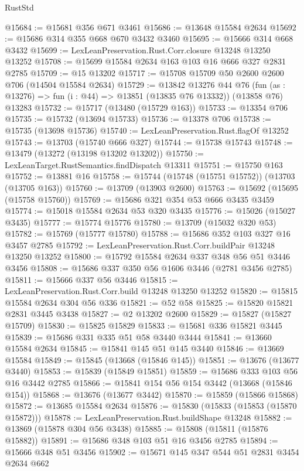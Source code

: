 \begin{lexlean}{RustStd}
\begin{coremodule}
@15684 := @15681 @356 @671 @3461
@15686 := @13648 @15584 @2634
@15692 := @15686 @314 @355 @668 @670 @3432 @3460
@15695 := @15666 @314 @668 @3432
@15699 := LexLeanPreservation.Rust.Corr.closure @13248 @13250 @13252
@15708 := @15699 @15584 @2634 @163 @103 @16 @666 @327 @2831 @2785
@15709 := @15 @13202
@15717 := @15708 @15709 @50 @2600 @2600 @706 (@14504 @15584 @2634)
@15729 := @13842
    @13276
    @44
    @76
    (fun (as : @13276) => fun (i : @44) => @13851 (@13835 @76 @13332))
    (@13858 @76)
    @13283
@15732 := @15717 (@13480 (@15729 @163))
@15733 := @13354 @706
@15735 := @15732 (@13694 @15733)
@15736 := @13378 @706
@15738 := @15735 (@13698 @15736)
@15740 := LexLeanPreservation.Rust.flagOf @13252
@15743 := @13703 (@15740 @666 @327)
@15744 := @15738 @15743
@15748 := @13479 (@13272 (@13198 @13202 @13202))
@15750 := LexLeanTarget.RustSemantics.findDispatch @13311
@15751 := @15750 @163
@15752 := @13881 @16
@15758 := @15744 (@15748 (@15751 @15752)) (@13703 (@13705 @163))
@15760 := @13709 (@13903 @2600)
@15763 := @15692 (@15695 (@15758 @15760))
@15769 := @15686 @321 @354 @53 @666 @3435 @3459
@15774 := @15018 @15584 @2634 @53 @320 @3435
@15776 := @15026 (@15027 @3435)
@15777 := @15774 @15776
@15780 := @13709 (@15032 @320 @53)
@15782 := @15769 (@15777 @15780)
@15788 := @15686 @352 @103 @327 @16 @3457 @2785
@15792 := LexLeanPreservation.Rust.Corr.buildPair @13248 @13250 @13252
@15800 := @15792 @15584 @2634 @337 @348 @56 @51 @3446 @3456
@15808 := @15686 @337 @350 @56 @1606 @3446 (@2781 @3456 @2785)
@15811 := @15666 @337 @56 @3446
@15815 := LexLeanPreservation.Rust.Corr.build @13248 @13250 @13252
@15820 := @15815 @15584 @2634 @304 @56 @336
@15821 := @52 @58
@15825 := @15820 @15821 @2831 @3445 @3438
@15827 := @2 @13202 @2600
@15829 := @15827 (@15827 @15709)
@15830 := @15825 @15829
@15833 := @15681 @336 @15821 @3445
@15839 := @15686 @331 @335 @51 @58 @3440 @3444
@15841 := @13660 @15584 @2634
@15845 := @15841 @145 @51 @145 @3440
@15846 := @13669 @15584
@15849 := @15845 (@13668 (@15846 @145))
@15851 := @13676 (@13677 @3440)
@15853 := @15839 (@15849 @15851)
@15859 := @15686 @333 @103 @56 @16 @3442 @2785
@15866 := @15841 @154 @56 @154 @3442 (@13668 (@15846 @154))
@15868 := @13676 (@13677 @3442)
@15870 := @15859 (@15866 @15868)
@15872 := @13685 @15584 @2634
@15876 := @15830 (@15833 (@15853 (@15870 @15872)))
@15878 := LexLeanPreservation.Rust.buildShape @13248
@15882 := @13869 (@15878 @304 @56 @3438)
@15885 := @15808 (@15811 (@15876 @15882))
@15891 := @15686 @348 @103 @51 @16 @3456 @2785
@15894 := @15666 @348 @51 @3456
@15902 := @15671 @145 @347 @544 @51 @2831 @3454 @2634 @662

\end{coremodule}
\end{lexlean}
